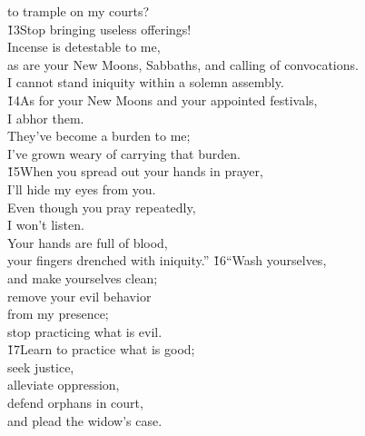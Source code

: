 \begin{poetry}
\poemlll       to trample on my courts? \\
\poeml \v{13}Stop bringing useless offerings! \\
\poemll    Incense is detestable to me, \\
\poeml as are your New Moons, Sabbaths, and calling of convocations. \\
\poemll    I cannot stand iniquity within a solemn assembly. \\
\poeml \v{14}As for your New Moons and your appointed festivals, \\
\poemll    I abhor them. \\
\poeml They've become a burden to me; \\
\poemll    I've grown weary of carrying that burden. \\
\poeml \v{15}When you spread out your hands in prayer, \\
\poemll    I'll hide my eyes from you. \\
\poeml Even though you pray repeatedly, \\
\poemll    I won't listen. \\
\poeml Your hands are full of blood, \\
\poemll    your fingers drenched with iniquity.''
\poeml \v{16}``Wash yourselves, \\
\poemll    and make yourselves clean; \\
\poeml remove your evil behavior \\
\poemll    from my presence; \\
\poemlll       stop practicing what is evil. \\
\poeml \v{17}Learn to practice what is good; \\
\poemll    seek justice, \\
\poeml alleviate oppression, \\
\poemll    defend orphans in court, \\
\poemlll       and plead the widow's case. \\

\end{poetry}
